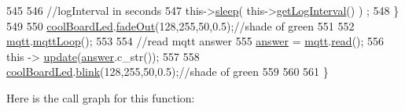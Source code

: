 \begin{DoxyCode}
545 
546         \textcolor{comment}{//logInterval in seconds}
547         this->\hyperlink{class_cool_board_a069952cdcb2e7f68518aa429eceadb6e}{sleep}( this->\hyperlink{class_cool_board_a7508e029f2ee17bb747ffab599285e0d}{getLogInterval}() ) ;
548     \}
549 
550     \hyperlink{class_cool_board_a1b1d3c684a5baa56b08486e192fd8e97}{coolBoardLed}.\hyperlink{class_cool_board_led_a93d545679237e8cc858324367149775c}{fadeOut}(128,255,50,0.5);\textcolor{comment}{//shade of green        }
551 
552     \hyperlink{class_cool_board_a2399f44d7c23c1149a335cb3b46d90f1}{mqtt}.\hyperlink{class_cool_m_q_t_t_aa5eaae967b562b62cbcf2b8d81f6e5d5}{mqttLoop}();
553 
554     \textcolor{comment}{//read mqtt answer}
555     \hyperlink{class_cool_board_a7b835fafd449e5282f7f91d787a2dc15}{answer} = \hyperlink{class_cool_board_a2399f44d7c23c1149a335cb3b46d90f1}{mqtt}.\hyperlink{class_cool_m_q_t_t_ae3c18f6ae9723746d32765f1c8f176ca}{read}();
556     \textcolor{keyword}{this} -> \hyperlink{class_cool_board_a8612756d3f73198cdde857a66f0fe690}{update}(\hyperlink{class_cool_board_a7b835fafd449e5282f7f91d787a2dc15}{answer}.c\_str()); 
557 
558     \hyperlink{class_cool_board_a1b1d3c684a5baa56b08486e192fd8e97}{coolBoardLed}.\hyperlink{class_cool_board_led_a96e1ea13003eee34c9dbcef340404426}{blink}(128,255,50,0.5);\textcolor{comment}{//shade of green    }
559 
560 
561 \}
\end{DoxyCode}
Here is the call graph for this function\+:\nopagebreak
